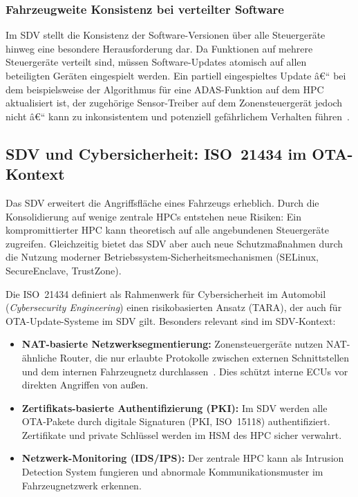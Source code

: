 ﻿\documentclass[12pt,a4paper,twoside]{article}
\begin{document}
\subsubsection{Fahrzeugweite Konsistenz bei verteilter Software}

Im SDV stellt die Konsistenz der Software-Versionen über alle Steuergeräte
hinweg eine besondere Herausforderung dar. Da Funktionen auf mehrere Steuergeräte
verteilt sind, müssen Software-Updates atomisch auf allen beteiligten Geräten
eingespielt werden. Ein partiell eingespieltes Update â€“ bei dem beispielsweise
der Algorithmus für eine ADAS-Funktion auf dem HPC aktualisiert ist, der
zugehörige Sensor-Treiber auf dem Zonensteuergerät jedoch nicht â€“ kann zu
inkonsistentem und potenziell gefährlichem Verhalten führen~\cite{halder2020secure}.

\subsection{SDV und Cybersicherheit: ISO~21434 im OTA-Kontext}
\label{subsec:sdv_cybersecurity}

Das SDV erweitert die Angriffsfläche eines Fahrzeugs erheblich. Durch die
Konsolidierung auf wenige zentrale HPCs entstehen neue Risiken: Ein kompromittierter
HPC kann theoretisch auf alle angebundenen Steuergeräte zugreifen. Gleichzeitig
bietet das SDV aber auch neue Schutzmaßnahmen durch die Nutzung moderner
Betriebssystem-Sicherheitsmechanismen (SELinux, SecureEnclave, TrustZone).

Die ISO~21434 definiert als Rahmenwerk für Cybersicherheit im Automobil
(\textit{Cybersecurity Engineering}) einen risikobasierten Ansatz (TARA), der
auch für OTA-Update-Systeme im SDV gilt. Besonders relevant sind im SDV-Kontext:

\begin{itemize}
  \item \textbf{NAT-basierte Netzwerksegmentierung:} Zonensteuergeräte nutzen
    NAT-ähnliche Router, die nur erlaubte Protokolle zwischen externen
    Schnittstellen und dem internen Fahrzeugnetz durchlassen~\cite{schneider2026ladekomm}.
    Dies schützt interne ECUs vor direkten Angriffen von außen.
  \item \textbf{Zertifikats-basierte Authentifizierung (PKI):} Im SDV werden
    alle OTA-Pakete durch digitale Signaturen (PKI, ISO~15118) authentifiziert.
    Zertifikate und private Schlüssel werden im HSM des HPC sicher verwahrt.
  \item \textbf{Netzwerk-Monitoring (IDS/IPS):} Der zentrale HPC kann als
    Intrusion Detection System fungieren und abnormale Kommunikationsmuster
    im Fahrzeugnetzwerk erkennen.
\end{itemize}
\end{document}
